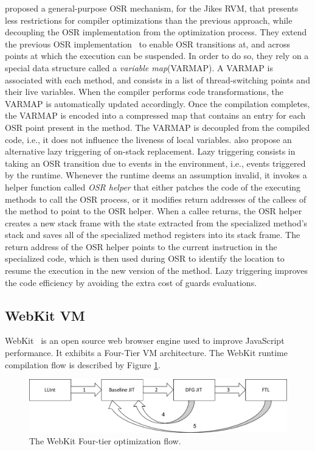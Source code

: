  proposed a general-purpose OSR mechanism, for the Jikes RVM, that presents less restrictions for compiler optimizations than the previous approach, while decoupling the OSR implementation from the optimization process.
They extend the previous OSR implementation~\cite{fink2003design} to enable OSR transitions at, and across points at which the execution can be suspended.
In order to do so, they rely on a special data structure called a \textit{variable map}(VARMAP).
A VARMAP is associated with each method, and consists in a list of thread-switching points and their live variables.
When the compiler performs code transformations, the VARMAP is automatically updated accordingly.
Once the compilation completes, the VARMAP is encoded into a compressed map that contains an entry for each OSR point present in the method.
The VARMAP is decoupled from the compiled code, i.e., it does not influence the liveness of local variables.
 also propose an alternative lazy triggering of on-stack replacement.
Lazy triggering consists in taking an OSR transition due to events in the environment, i.e., events triggered by the runtime. 
Whenever the runtime deems an assumption invalid, it invokes a helper function called \textit{OSR helper} that either patches the code of the executing methods to call the OSR process, or it modifies return addresses of the callees of the method to point to the OSR helper.
When a callee returns, the OSR helper creates a new stack frame with the state extracted from the specialized method's stack and saves all of the specialized method registers into its stack frame. 
The return address of the OSR helper points to the current instruction in the specialized code, which is then used during OSR to identify the location to resume the execution in the new version of the method.
Lazy triggering improves the code efficiency by avoiding the extra cost of guards evaluations.\\

\subsection{WebKit VM}\label{webkit}

WebKit~\cite{WebKitURL} is an open source web browser engine used to improve JavaScript performance.
It exhibits a Four-Tier VM architecture. 
The WebKit runtime compilation flow is described by Figure \ref{FTL}.\\
\begin{figure}[h]
\centering
\includegraphics[scale=0.5]{Figures/FTL}
\decoRule
\caption[The WebKit FTL]{The WebKit Four-tier optimization flow.}
\label{FTL}
\end{figure}
 
